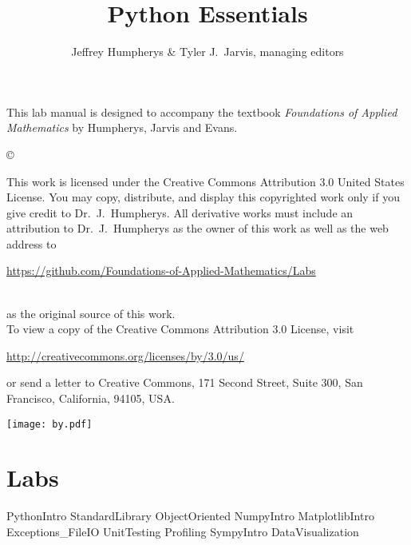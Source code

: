 \documentclass[opener-c,labs,black,nociteref]{HJnewsiambook}
\title{Python Essentials}
\author{Jeffrey Humpherys \& Tyler J.~Jarvis, managing editors}
\begin{document}

\thispagestyle{empty} %
\maketitle
\thispagestyle{empty}
\frontmatter



\begin{thepreface} %

This lab manual is designed to accompany the textbook \emph{Foundations of Applied Mathematics} by Humpherys, Jarvis and Evans.

\vfill
\copyright{This work is licensed under the Creative Commons Attribution 3.0 United States
License.  You may copy, distribute, and display this copyrighted work only if you give
credit to Dr.~J.~Humpherys. All derivative works must include an attribution to Dr.~J.~Humpherys as the owner of this work as well as the web address to
\\\centerline{\url{https://github.com/Foundations-of-Applied-Mathematics/Labs}}\\as the original source of this work.
\\To view a copy of the Creative Commons Attribution 3.0 License, visit
\\\centerline{\url{http://creativecommons.org/licenses/by/3.0/us/}} or send a letter to Creative Commons, 171 Second Street, Suite 300, San Francisco, California, 94105, USA.}

\vfill
\centering\texttt{[image: by.pdf]}
\vfill
\end{thepreface}

\setcounter{tocdepth}{1}
\tableofcontents

\mainmatter %

\part{Labs}
{PythonIntro}
{StandardLibrary}
{ObjectOriented}
{NumpyIntro}
{MatplotlibIntro}
{Exceptions_FileIO}
{UnitTesting}
{Profiling}
{SympyIntro}
{DataVisualization}
\end{document}
